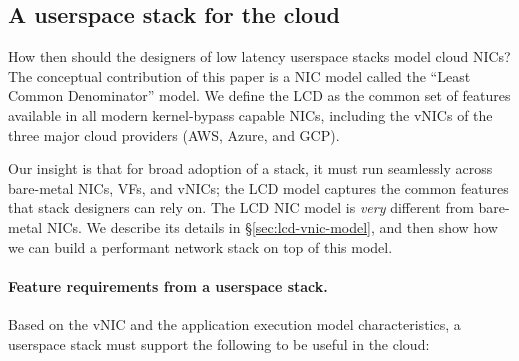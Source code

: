 % 

\subsection{A userspace stack for the cloud}
\label{sec:requirements}
How then should the designers of low latency userspace stacks model cloud NICs?
The conceptual contribution of this paper is a NIC model called the ``Least Common Denominator'' model.
We define the LCD as the common set of features available in all modern kernel-bypass capable NICs, including the vNICs of the three major cloud providers (AWS, Azure, and GCP).

Our insight is that for broad adoption of a stack, it must run seamlessly across bare-metal NICs, VFs, and vNICs; the LCD model captures the common features that stack designers can rely on.
The LCD NIC model is \emph{very} different from bare-metal NICs.
We describe its details in \S\ref{sec:lcd-vnic-model}, and then show how we can build a performant network stack on top of this model.

\paragraph{Feature requirements from a userspace stack.}
Based on the vNIC and the application execution model characteristics, a userspace stack must support the following to be useful in the cloud:

